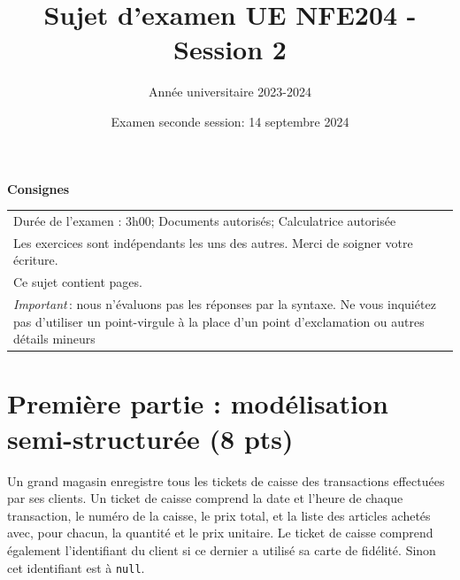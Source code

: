 \documentclass[11pt,a4paper]{article}
\begin{document}
\title{Sujet d'examen UE NFE204 - Session 2}
\author{Année universitaire 2023-2024}
\date{Examen seconde session: 14 septembre  2024}

\maketitle

\begin{center}
{\bf \Large Consignes}\\
\begin{tabular}{| p{15cm} |}
\hline
Dur\'ee de l'examen : 3h00; Documents autoris\'es;  Calculatrice autoris\'ee\\

Les exercices sont indépendants les uns des autres. Merci de soigner votre écriture.\\
Ce sujet contient \pageref{LastPage} pages.\\

\textit{Important}\,: nous n'évaluons pas les réponses par la syntaxe. Ne vous
inquiétez pas d'utiliser un point-virgule à la place d'un point d'exclamation ou
autres détails mineurs
\\
\hline
\end{tabular}
\end{center}


\section*{Première partie : modélisation semi-structurée (8 pts)}

Un grand magasin enregistre tous les tickets de caisse des transactions effectuées par ses clients.
Un ticket de caisse comprend la date et l'heure de chaque transaction, le numéro de la caisse, le prix total,
et la liste des articles achetés avec, pour chacun, la quantité et le prix unitaire.  Le ticket de caisse comprend également
l'identifiant du client si ce dernier a utilisé sa carte de fidélité. Sinon cet identifiant
est à \texttt{null}.
\end{document}
